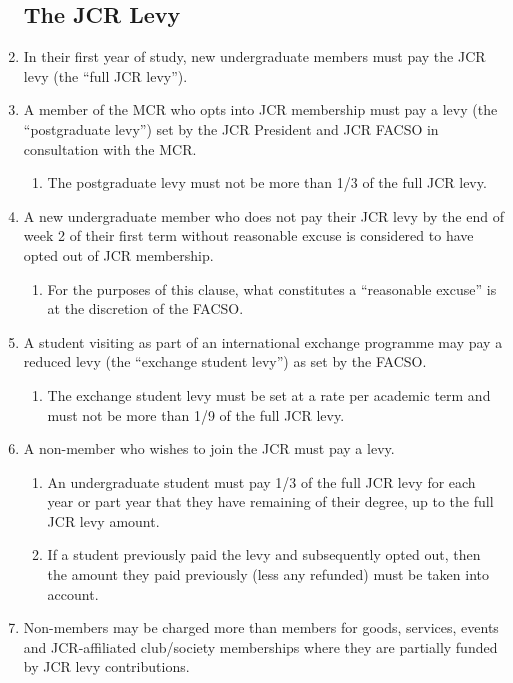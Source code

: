 \documentclass[12pt]{article}
\begin{document}
\begin{enumerate}
    \subsection{The JCR Levy}
    \item In their first year of study, new undergraduate members must pay the JCR levy (the ``full JCR levy'').
    \item A member of the MCR who opts into JCR membership must pay a levy (the ``postgraduate levy'') set by the JCR President and JCR FACSO in consultation with the MCR.
    \begin{enumerate}
        \item The postgraduate levy must not be more than 1/3 of the full JCR levy.
    \end{enumerate}
    \item A new undergraduate member who does not pay their JCR levy by the end of week 2 of their first term without reasonable excuse is considered to have opted out of JCR membership.
    \begin{enumerate}
        \item For the purposes of this clause, what constitutes a ``reasonable excuse'' is at the discretion of the FACSO.
    \end{enumerate}
    \item A student visiting as part of an international exchange programme may pay a reduced levy (the ``exchange student levy'') as set by the FACSO.
    \begin{enumerate}
        \item The exchange student levy must be set at a rate per academic term and must not be more than 1/9 of the full JCR levy.
    \end{enumerate}
    \item A non-member who wishes to join the JCR must pay a levy.
    \begin{enumerate}
        \item An undergraduate student must pay 1/3 of the full JCR levy for each year or part year that they have remaining of their degree, up to the full JCR levy amount.
        \item If a student previously paid the levy and subsequently opted out, then the amount they paid previously (less any refunded) must be taken into account.
    \end{enumerate}
    \item Non-members may be charged more than members for goods, services, events and JCR-affiliated club/society memberships where they are partially funded by JCR levy contributions.

\end{enumerate}
\end{document}
